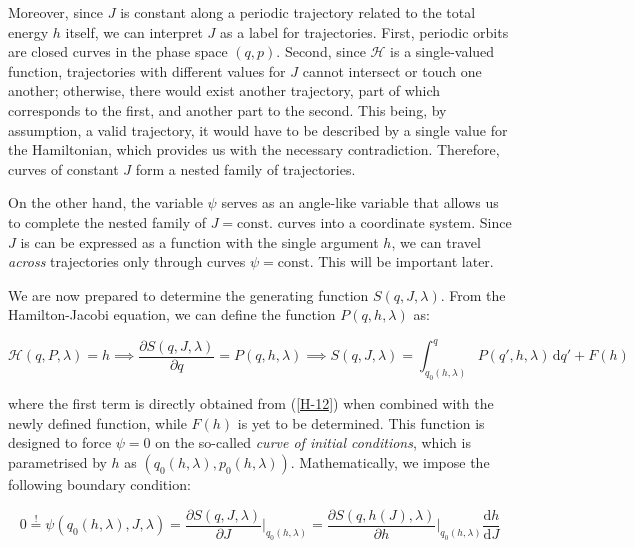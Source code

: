 \vspace*{2.5pt}

\quad Moreover, since $J$ is constant along a periodic trajectory related to the total energy $h$ itself, we can interpret $J$ as a label for trajectories. First, periodic orbits are closed curves in the phase space $(q,p)$. Second, since $\mathcal{H}$ is a single-valued function, trajectories with different values for $J$ cannot intersect or touch one another; otherwise, there would exist another trajectory, part of which corresponds to the first, and another part to the second. This being, by assumption, a valid trajectory, it would have to be described by a single value for the Hamiltonian, which provides us with the necessary contradiction. Therefore, curves of constant $J$ form a nested family of trajectories.

\vspace*{2.5pt}

\quad On the other hand, the variable $\psi$ serves as an angle-like variable that allows us to complete the nested family of $J=\text{const}.$ curves into a coordinate system. Since $J$ is can be expressed as a function with the single argument $h$, we can travel \textit{across} trajectories only through curves $\psi=\text{const.}$ This will be important later.

\vspace*{2.5pt}

\quad We are now prepared to determine the generating function $S(q,J,\lambda)$. From the Hamilton-Jacobi equation, we can define the function $P(q,h,\lambda)$ as:

\begin{equation*}
    \mathcal{H}(q,P,\lambda)=h\implies\frac{\partial S(q,J,\lambda)}{\partial q}=P(q,h,\lambda)\implies S(q,J,\lambda)=\int_{q_0(h,\lambda)}^q P(q',h,\lambda)\,\mathrm{d}q'+F(h)
\end{equation*}

where the first term is directly obtained from (\ref{H-12}) when combined with the newly defined function, while $F(h)$ is yet to be determined. This function is designed to force $\psi=0$ on the so-called \textit{curve of initial conditions}, which is parametrised by $h$ as $(q_0(h,\lambda),p_0(h,\lambda))$. Mathematically, we impose the following boundary condition:

\begin{equation}
    \label{H-14}
    0\stackrel{!}{=}\psi(q_0(h,\lambda),J,\lambda)=\frac{\partial S(q,J,\lambda)}{\partial J}\biggr|_{q_0(h,\lambda)}=\frac{\partial S(q,h(J),\lambda)}{\partial h}\biggr|_{q_0(h,\lambda)}\frac{\mathrm{d}h}{\mathrm{d}J}
\end{equation}

